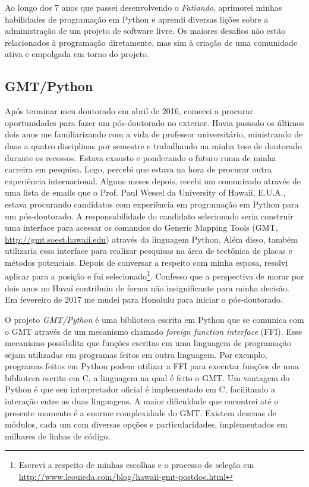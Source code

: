 Ao longo dos 7 anos que passei desenvolvendo o \textit{Fatiando},
aprimorei minhas habilidades de programação em Python e aprendi diversas lições
sobre a administração de um projeto de software livre.
Os maiores desafios não estão relacionados à programação diretamente, mas sim à
criação de uma comunidade ativa e empolgada em torno do projeto.


\subsection{GMT/Python}

Após terminar meu doutorado em abril de 2016, comecei a procurar oportunidades
para fazer um pós-doutorado no exterior.
Havia passado os últimos dois anos me familiarizando com a vida de professor
universitário, ministrando de duas a quatro disciplinas por semestre e
trabalhando na minha tese de doutorado durante os recessos.
Estava exausto e ponderando o futuro ruma de minha carreira em pesquisa.
Logo, percebi que estava na hora de procurar outra experiência internacional.
Alguns meses depois, recebi um comunicado através de uma lista de emails que o
Prof. Paul Wessel da University of Hawaii, E.U.A., estava procurando candidatos
com experiência em programação em Python para um pós-doutorado.
A responsabilidade do candidato selecionado seria construir uma interface
para acessar os comandos do Generic Mapping Tools (GMT,
\url{http://gmt.soest.hawaii.edu}) através da linguagem Python.
Além disso, também utilizaria essa interface para realizar pesquisas na área de
tectônica de placas e métodos potenciais.
Depois de conversar a respeito com minha esposa, resolvi aplicar para a
posição e fui selecionado\footnote{Escrevi a respeito de minhas escolhas e o
processo de seleção em
\url{http://www.leouieda.com/blog/hawaii-gmt-postdoc.html}}.
Confesso que a perspectiva de morar por dois anos no Havaí contribuiu
de forma não insignificante para minha decisão.
Em fevereiro de 2017 me mudei para Honolulu para iniciar o pós-doutorado.

O projeto \textit{GMT/Python} é uma biblioteca escrita em Python que se
comunica com o GMT através de um mecanismo chamado \textit{foreign function
interface} (FFI).
Esse mecanismo possibilita que funções escritas em uma linguagem de programação
sejam utilizadas em programas feitos em outra linguagem.
Por exemplo, programas feitos em Python podem utilizar a FFI para executar
funções de uma biblioteca escrita em C, a linguagem na qual é feito o GMT.
Um vantagem do Python é que seu interpretador oficial é implementado em C,
facilitando a interação entre as duas linguagens.
A maior dificuldade que encontrei até o presente momento é a enorme
complexidade do GMT.
Existem dezenas de módulos, cada um com diversas opções e particularidades,
implementados em milhares de linhas de código.

